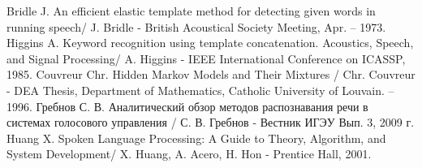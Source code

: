 \documentclass[a4paper,14pt,russian,utf8,nocolumnsxix,nocolumnxxxi,nocolumnxxxii]{eskdtext}
\begin{document}
\begin{thebibliography}{99}
Bridle J. An efficient elastic template method for detecting given words in running speech/ J. Bridle - British Acoustical Society Meeting, Apr. – 1973.
Higgins A. Keyword recognition using template concatenation. Acoustics, Speech, and Signal Processing/ A. Higgins - IEEE International Conference on ICASSP, 1985.
Couvreur Chr. Hidden Markov Models and Their Mixtures / Chr. Couvreur - DEA Thesis, Department of Mathematics, Catholic University of Louvain. – 1996.
Гребнов С. В. Аналитический обзор методов распознавания речи в системах голосового управления / С. В. Гребнов - Вестник ИГЭУ Вып. 3, 2009 г.
Huang X.  Spoken Language Processing: A Guide to Theory, Algorithm, and System Development/ X. Huang, A. Acero, H. Hon - Prentice Hall, 2001.

\end{thebibliography}
\end{document}
